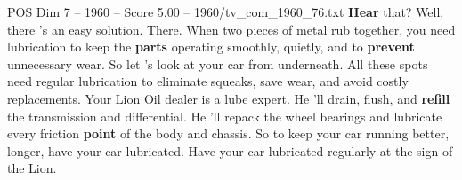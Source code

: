 \begin{textsample}{POS Dim 7 – 1960 – Score 5.00 – 1960/tv\_com\_1960\_76.txt}  \label{ex:f7_pos_023}
\textbf{Hear} that?
Well, there 's an easy solution.
There.
When two pieces of metal rub together, you need lubrication to keep the \textbf{parts} operating smoothly, quietly, and to \textbf{prevent} unnecessary wear.
So let 's look at your car from underneath.
All these spots need regular lubrication to eliminate squeaks, save wear, and avoid costly replacements.
Your Lion Oil dealer is a lube expert.
He 'll drain, flush, and \textbf{refill} the transmission and differential.
He 'll repack the wheel bearings and lubricate every friction \textbf{point} of the body and chassis.
So to keep your car running better, longer, have your car lubricated.
Have your car lubricated regularly at the sign of the Lion.

\end{textsample}
